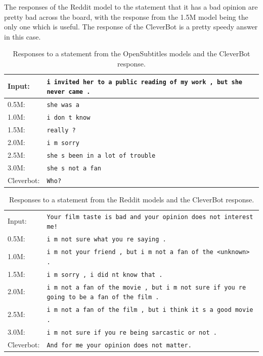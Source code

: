 The responses of the Reddit model to the statement that it has a bad opinion are pretty bad across the board, with the response from the 1.5M model being the only one which is useful. The response of the CleverBot is a pretty speedy answer in this case.
\\
\begin{table}[H]
	\centering
	\begin{adjustbox}{max width=\textwidth}
		\begin{tabular}{ll}
			\toprule
			Input: 	& \texttt{i invited her to a public reading of my work , but she never came .}\\
			\midrule
			0.5M: 	& \texttt{she was a}\\
			1.0M: 	& \texttt{i don t know}\\
			1.5M:	& \texttt{really ?}\\
			2.0M:	& \texttt{i m sorry}\\
			2.5M:	& \texttt{she s been in a lot of trouble}\\
			3.0M:	& \texttt{she s not a fan}\\
			Cleverbot:	& \texttt{Who?}\\
			\bottomrule
		\end{tabular}
	\end{adjustbox}
	\caption{Responses to a statement from the OpenSubtitles models and the CleverBot response.}
	\label{results:example6_output:OpenSubtitle_compared}
\end{table}
\begin{table}[H]
	\centering
	\begin{adjustbox}{max width=\textwidth}
		\begin{tabular}{ll}
			\toprule
			Input: 	& \texttt{Your film taste is bad and your opinion does not interest me!}\\
			0.5M: 	& \texttt{i m not sure what you re saying .}\\
			1.0M: 	& \texttt{i m not your friend , but i m not a fan of the <unknown> .}\\
			1.5M:	& \texttt{i m sorry , i did nt know that .}\\
			2.0M:	& \texttt{i m not a fan of the movie , but i m not sure if you re going to be a fan of the film .}\\
			2.5M:	& \texttt{i m not a fan of the film , but i think it s a good movie .}\\
			3.0M:	& \texttt{i m not sure if you re being sarcastic or not .}\\
			Cleverbot:	& \texttt{And for me your opinion does not matter.}\\
			\bottomrule
		\end{tabular}
	\end{adjustbox}
	\caption{Responses to a statement from the Reddit models and the CleverBot response.}
	\label{results:example6_output:Reddit_compared}
\end{table}

